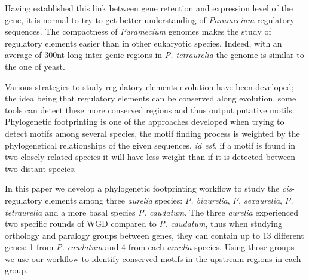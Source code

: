 Having established this link between gene retention and expression level of the gene, it is normal to try to get better understanding of \textit{Paramecium} regulatory sequences. The compactness of \textit{Paramecium} genomes makes the study of regulatory elements easier than in other eukaryotic species. Indeed, with an average of 300nt long inter-genic regions in \textit{P. tetraurelia} the genome is similar to the one of yeast.

Various strategies to study regulatory elements evolution have been developed; the idea being that regulatory elements can be conserved along evolution, some tools can detect these more conserved regions and thus output putative motifs. Phylogenetic footprinting is one of the approaches developed when trying to detect motifs among several species, the motif finding process is weighted by the phylogenetical relationships of the given sequences, \textit{id est}, if a motif is found in two closely related species it will have less weight than if it is detected between two distant species.

In this paper we develop a phylogenetic footprinting workflow to study the \textit{cis}-regulatory elements among three \textit{aurelia} species: \textit{P. biaurelia}, \textit{P. sexaurelia}, \textit{P. tetraurelia} and a more basal species \textit{P. caudatum}. The three \textit{aurelia} experienced two specific rounds of WGD compared to \textit{P. caudatum}, thus when studying orthology and paralogy groups between genes, they can contain up to 13 different genes: 1 from \textit{P. caudatum} and 4 from each \textit{aurelia} species. Using those groups we use our workflow to identify conserved motifs in the upstream regions in each group.

